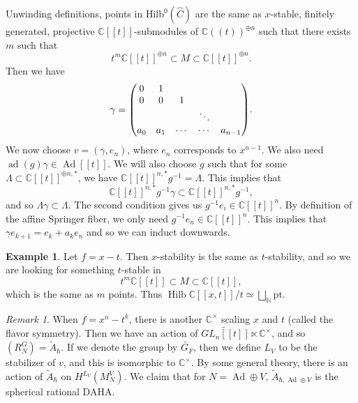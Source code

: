 \documentclass[leqno, openany]{memoir}
\theoremstyle{definition}
\newtheorem{exm}[thm]{Example}
\theoremstyle{remark}
\newtheorem{rmk}[thm]{Remark}
\theoremstyle{plain}
\theoremstyle{definition}
\theoremstyle{remark}
\newcommand{\C}{\mathbb{C}}
\newcommand{\mr}[1]{\mathrm{#1}}
\newcommand{\on}[1]{\operatorname{#1}}
\newcommand{\wt}[1]{\widetilde{#1}}
\newcommand{\wh}[1]{\widehat{#1}}
\newcommand{\1}{\mathbf{1}}
\newcommand{\2}{\mathbf{2}}
\newcommand{\3}{\mathbf{3}}
\DeclareMathOperator{\ad}{ad}
\DeclareMathOperator{\Ad}{Ad}
\begin{document}
Unwinding definitions, points in $\mr{Hilb}^0(\wh{C})$ are the same as $x$-stable, finitely generated, projective $\C[[t]]$-submodules of $\C((t))^{\oplus n}$ such that there exists $m$ such that
\[ t^m \C[[t]]^{\oplus n} \subset M \subset \C[[t]]^{\oplus n}. \]
Then we have
\[ \gamma = \mqty(0 & 1 & \\
0 & 0 & 1 \\
& & & \ddots \\
a_0 & a_1 & \cdots & \cdots & a_{n-1}). \]
We now choose $v = (\gamma, e_n)$, where $e_n$ corresponds to $x^{n-1}$. We also need $\ad(g) \gamma \in \Ad [[t]]$. We will also choose $g$ such that for some $\Lambda \subset \C[[t]]^{\oplus n, *}$, we have $\C[[t]]^{n, *} g^{-1} = \Lambda$. This implies that
\[ \C[[t]]^{n,*} g^{-1} \gamma \subset \C[[t]]^{n,*} g^{-1}, \]
and so $\Lambda \gamma \subset \Lambda$. The second condition gives us $g^{-1} e_i \in \C[[t]]^n$. By definition of the affine Springer fiber, we only need $g^{-1} e_n \in \C[[t]]^n$. This implies that $\gamma e_{k+1} = e_k + a_k e_n$ and so we can induct downwards.

\begin{exm}
    Let $f = x-t$. Then $x$-stability is the same as $t$-stability, and so we are looking for something $t$-stable in
    \[ t^m \C[[t]] \subset M \subset \C[[t]], \]
    which is the same as $m$ points. Thus $\on{Hilb} \C[[x,t]]/t \simeq \bigsqcup_{\mathbb{N}} \mr{pt}$.
\end{exm}

\begin{rmk}
    When $f = x^n - t^k$, there is another $\C^{\times}$ scaling $x$ and $t$ (called the flavor symmetry). Then we have an action of $\wt{GL_n[[t]]} \ltimes \C^{\times}$, and so $(R_N^G) = \wt{A}_{\hbar}$. If we denote the group by $\wt{G_F}$, then we define $L_V$ to be the stabilizer of $v$, and this is isomorphic to $\C^{\times}$. By some general theory, there is an action of $\wt{A}_{\hbar}$ on $H^{L_V}(M_N^V)$. We claim that for $N = \Ad \oplus V$, $\wt{A}_{\hbar, \Ad \oplus V}$ is the spherical rational DAHA.
\end{rmk}
\end{document}
